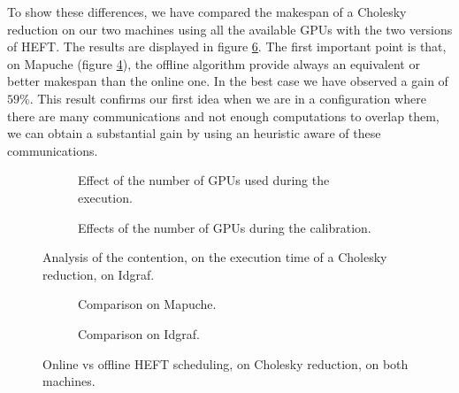 \documentclass[10pt, conference, compsocconf,pdftex,dvipsnames]{IEEEtran}
\begin{document}
To show these differences, we have compared the makespan of a Cholesky
reduction on our two machines using all the available GPUs  with the two
versions of HEFT. The results are displayed in figure \ref{fig:OnOff}. The
first important point is that, on Mapuche (figure \ref{fig:OnOffMapuche}), the
offline algorithm provide always an equivalent or better makespan than the
online one. In the best case we have observed a gain of $59\%$. This
result confirms our first idea when we are in a configuration where there are many
communications and not enough computations to overlap them, we can
obtain a substantial gain by using an heuristic aware
of these communications. 
\begin{figure}[htb]
        \addtocounter{figure}{1}
        \centering
        \begin{subfigure}{0.5\textwidth}
        \scalebox{0.6}{
            
        }
        \caption{Effect of the number of GPUs used during the execution.}
        \label{fig:ContentionGpu}
    \end{subfigure}
    \begin{subfigure}{0.5\textwidth}
        \scalebox{0.6}{
            \centering
            
        }
        \caption{Effects of the number of GPUs during the calibration.}
        \label{fig:ContentionTrick}
    \end{subfigure}
    \label{fig:Contention}
    \caption{Analysis of the contention, on the execution time of a 
    Cholesky reduction, on Idgraf.}

\end{figure}

\begin{figure}[bt]
    \addtocounter{figure}{-2}
    \centering
    \begin{subfigure}{0.4\textwidth}
        \hspace{-20pt}
        \scalebox{0.7}{
            
        }
        \caption{Comparison on Mapuche.}
        \label{fig:OnOffMapuche}
    \end{subfigure}
    \hspace{15pt}
    \begin{subfigure}{0.55\textwidth}
        \scalebox{0.7}{
            
        }
        \caption{Comparison on Idgraf.}
        \label{fig:OnOffIdgraf}
    \end{subfigure}
    \caption{Online vs offline HEFT scheduling, on Cholesky reduction, on both
    machines.}
    \label{fig:OnOff}
\end{figure}
\addtocounter{figure}{1}
\end{document}
